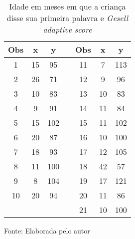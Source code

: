 \begin{table}[h] 
\centering
\caption{Idade em meses em que a criança disse sua primeira palavra e  \textit{Gesell adaptive score}}
\label{tab:chap02_data}
\begin{tabular}{ccccccc}
\mbox{Obs} & x & y & & \mbox{Obs} & x & y \\
\hline
1  & 15 & 95  & & 11 & 7  & 113 \\
2  & 26 & 71  & & 12 & 9  & 96  \\
3  & 10 & 83  & & 13 & 10 & 83  \\
4  & 9  & 91  & & 14 & 11 & 84  \\
5  & 15 & 102 & & 15 & 11 & 102 \\
6  & 20 & 87  & & 16 & 10 & 100 \\
7  & 18 & 93  & & 17 & 12 & 105 \\
8  & 11 & 100 & & 18 & 42 & 57  \\
9  & 8  & 104 & & 19 & 17 & 121 \\
10 & 20 & 94  & & 20 & 11 & 86  \\
   &    &     & & 21 & 10 & 100 \\
\hline
\end{tabular}

Fonte: Elaborada pelo autor
\end{table}



